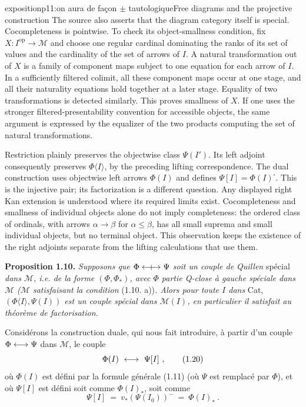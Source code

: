 \begin{dcomment}{exposition}{p11:on aura de façon $\pm$ tautologique}{Free diagrams and the projective construction}
The source also asserts that the diagram category itself is special. Cocompleteness is pointwise. To check its object-smallness condition, fix $X:I^{\mathrm{op}}\to\mathcal M$ and choose one regular cardinal dominating the ranks of its set of values and the cardinality of the set of arrows of $I$. A natural transformation out of $X$ is a family of component maps subject to one equation for each arrow of $I$. In a sufficiently filtered colimit, all these component maps occur at one stage, and all their naturality equations hold together at a later stage. Equality of two transformations is detected similarly. This proves smallness of $X$. If one uses the stronger filtered-presentability convention for accessible objects, the same argument is expressed by the equalizer of the two products computing the set of natural transformations.

Restriction plainly preserves the objectwise class $\Psi(I')$. Its left adjoint consequently preserves $\Phi\langle I\rangle$, by the preceding lifting correspondence. The dual construction uses objectwise left arrows $\Phi(I)$ and defines $\Psi[I]=\Phi(I)^{\square}$. This is the injective pair; its factorization is a different question. Any displayed right Kan extension is understood where its required limits exist. Cocompleteness and smallness of individual objects alone do not imply completeness: the ordered class of ordinals, with arrows $\alpha\to\beta$ for $\alpha\leq\beta$, has all small suprema and small individual objects, but no terminal object. This observation keeps the existence of the right adjoints separate from the lifting calculations that use them.
\end{dcomment}


\textbf{Proposition 1.10.} \textit{Supposons que $\Phi \mathrel{\leftarrow\mkern-9mu{+}\mkern-9mu\rightarrow} \Psi$ soit un couple de Quillen} spécial \textit{dans $\mathcal{M}$, i.e. de la forme $(\Phi, \Phi_{*})$, avec $\Phi$ partie Q-close à gauche spéciale dans $\mathcal{M}$ ($\mathcal{M}$ satisfaisant la condition} (1.10. a))\textit{. Alors pour toute $I$ dans} Cat, \textit{$(\Phi\langle I\rangle, \Psi(I))$ est un couple spécial dans $\mathcal{M}(I)$, en particulier il satisfait au théorème de factorisation.}

Considérons la construction duale, qui nous fait introduire, à partir d'un couple $\Phi \longleftrightarrow \Psi$ dans $\mathcal{M}$, le couple
\[
\Phi(I) \ \longleftrightarrow\ \Psi[I]\ , \tag*{(1.20)}
\]
où $\Phi(I)$ est défini par la formule générale (1.11) (où $\Psi$ est remplacé par $\Phi$), et où $\Psi[I]$ est défini soit comme $\Phi(I)_{*}$, soit comme
\[
\Psi[I] \ =\ v_{*}(\Psi(I_0))^{-} \ =\ \Phi(I)_{*}\ . \tag*{(1.21)}
\]

